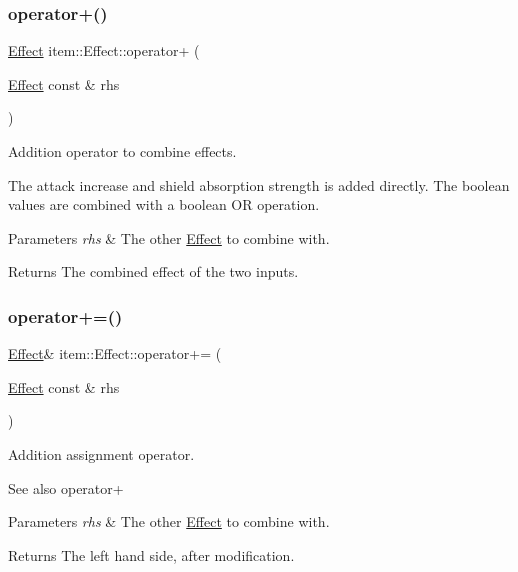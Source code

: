\subsubsection{\texorpdfstring{operator+()}{operator+()}}
{\footnotesize\ttfamily \hyperlink{classitem_1_1_effect}{Effect} item\+::\+Effect\+::operator+ (\begin{DoxyParamCaption}\item[{\hyperlink{classitem_1_1_effect}{Effect} const \&}]{rhs }\end{DoxyParamCaption})\hspace{0.3cm}{\ttfamily [inline]}}



Addition operator to combine effects. 

The attack increase and shield absorption strength is added directly. The boolean values are combined with a boolean OR operation. 
\begin{DoxyParams}{Parameters}
{\em rhs} & The other {\ttfamily \hyperlink{classitem_1_1_effect}{Effect}} to combine with. \\
\hline
\end{DoxyParams}
\begin{DoxyReturn}{Returns}
The combined effect of the two inputs. 
\end{DoxyReturn}
\mbox{\label{classitem_1_1_effect_af0d65e5a848289bfd28bfe980da51915}} 
\subsubsection{\texorpdfstring{operator+=()}{operator+=()}}
{\footnotesize\ttfamily \hyperlink{classitem_1_1_effect}{Effect}\& item\+::\+Effect\+::operator+= (\begin{DoxyParamCaption}\item[{\hyperlink{classitem_1_1_effect}{Effect} const \&}]{rhs }\end{DoxyParamCaption})\hspace{0.3cm}{\ttfamily [inline]}}



Addition assignment operator. 

\begin{DoxySeeAlso}{See also}
operator+ 
\end{DoxySeeAlso}

\begin{DoxyParams}{Parameters}
{\em rhs} & The other {\ttfamily \hyperlink{classitem_1_1_effect}{Effect}} to combine with. \\
\hline
\end{DoxyParams}
\begin{DoxyReturn}{Returns}
The left hand side, after modification. 
\end{DoxyReturn}
\mbox{\label{classitem_1_1_effect_a3a78c050c37dd9204aa35c25a0f65282}} 
